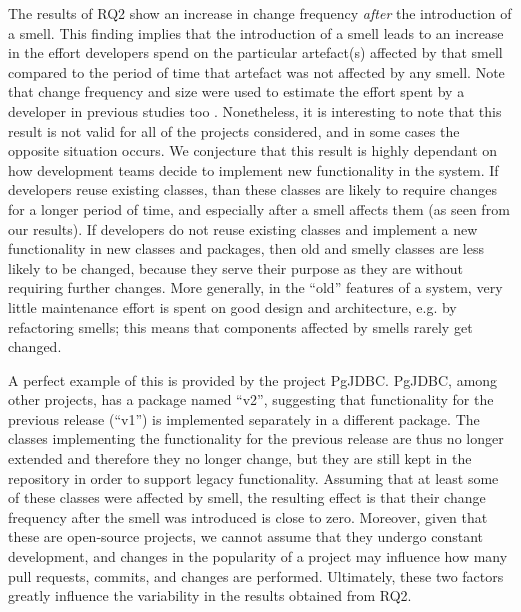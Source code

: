 
The results of RQ2 show an increase in change frequency \emph{after} the introduction of a smell.
This finding implies that the introduction of a smell leads to an increase in the effort developers spend on the particular artefact(s) affected by that smell compared to the period of time that artefact was not affected by any smell. 
Note that change frequency and size were used to estimate the effort spent by a developer in previous studies too \cite{Sjoberg2013,Olbrich2009,Nugroho2011}.
Nonetheless, it is interesting to note that this result is not valid for all of the projects considered, and in some cases the opposite situation occurs.
We conjecture that this result is highly dependant on how development teams decide to implement new functionality in the system.
If developers reuse existing classes, than these classes are likely to require changes for a longer period of time, and especially after a smell affects them (as seen from our results).
If developers do not reuse existing classes and implement a new functionality in new classes and packages, then old and smelly classes are less likely to be changed, because they serve their purpose as they are without requiring further changes.
More generally, in the ``old'' features of a system, very little maintenance effort is spent on good design and architecture, e.g. by refactoring smells; this means that components affected by smells rarely get changed.

A perfect example of this is provided by the project PgJDBC.
PgJDBC, among other projects, has a package named ``v2'', suggesting that functionality for the previous release (``v1'') is implemented separately in a different package.
The classes implementing the functionality for the previous release are thus no longer extended and therefore they no longer change, but they are still kept in the repository in order to support legacy functionality.
Assuming that at least some of these classes were affected by smell, the resulting effect is that their change frequency after the smell was introduced is close to zero.
Moreover, given that these are open-source projects, we cannot assume that they undergo constant development, and changes in the popularity of a project may influence how many pull requests, commits, and changes are performed. 
Ultimately, these two factors greatly influence the variability in the results obtained from RQ2.

